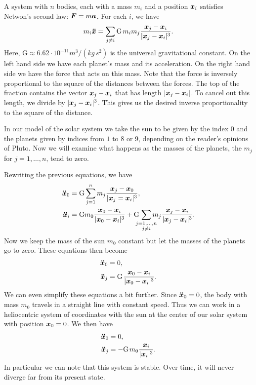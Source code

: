\documentclass[twoside,letterpaper,10pt]{article}
\numberwithin{equation}{section}
\begin{document}
A system with $n$ bodies, each with a mass $m_i$ and a position $\bm{x}_i$
satisfies Netwon's second law: $\bm{F} = m \bm{a}$.
For each $i$, we have
\begin{equation*}
  m_i \bdd{x} = \sum_{j \neq i} \mathrm{G} \nobreak\hspace{.125em plus
    .14286em} m_i m_j \frac{\bp{x}_j - \bp{x}_i}{|\bp{x}_j - \bp{x}_i|^3}.
\end{equation*}
Here, $\mathrm{G} \approx 6.62 \cdot 10^{-11} m^3 / (kg\, s^2)$ is the universal
gravitational constant.
On the left hand side we have each planet's mass and its acceleration.
On the right hand side we have the force that acts on this mass.
Note that the force is inversely proportional to the square of the distances
between the forces.
The top of the fraction contains the vector $\bm{x}_j - \bm{x}_i$ that has
length $|\bm{x}_j - \bm{x}_i|$.
To cancel out this length, we divide by $|\bm{x}_j - \bm{x}_i|^3$.
This gives us the desired inverse proportionality to the square of the distance.

In our model of the solar system we take the sun to be given by the index $0$
and the planets given by indices from $1$ to $8$ or $9$, depending on the
reader's opinions of Pluto.
Now we will examine what happens as the masses of the planets, the $m_j$ for $j
= 1, \ldots, n$, tend to zero.

Rewriting the previous equations, we have
\begin{align*}
  \bdd{x}_0 &= \mathrm{G} \sum_{j = 1}^n m_j \frac{\bp{x}_j -
              \bp{x}_0}{|\bp{x}_j = \bp{x}_i|^3},\\
  \bdd{x}_i &= \mathrm{G} m_0 \frac{\bp{x}_0 - \bp{x}_i}{|\bp{x}_0 -
              \bp{x}_i|^3} + \mathrm{G} \nobreak\hspace{.125em plus
              .14286em}
              \sum_{\mathclap{\substack{j=1,\ldots,n\\j\neq i}}}
              m_j \frac{\bp{x}_j - \bp{x}_i}{|\bp{x}_j - \bp{x}_i|^3}.
\end{align*}
Now we keep the mass of the sun $m_0$ constant but let the masses of the planets
go to zero.
These equations then become
\begin{align*}
  \bdd{x}_0 &= 0,\\
  \bdd{x}_j &= \mathrm{G} \nobreak\hspace{.125em plus .14286em} \frac{\bp{x}_0 -
              \bp{x}_i}{|\bp{x}_0 - \bp{x}_i|^3}.
\end{align*}
We can even simplify these equations a bit further.
Since $\bm{\ddot{x}}_0 = 0$, the body with mass $m_0$ travels in a straight line with
constant speed.
Thus we can work in a heliocentric system of coordinates with the sun at the
center of our solar system with position $\bm{x}_0 = 0$.
We then have
\begin{align*}
  \bdd{x}_0 &= 0,\\
  \bdd{x}_j &= - \mathrm{G} \nobreak\hspace{.125em plus .14286em}
              m_0 \frac{\bp{x}_i}{|\bp{x}_i|^3}.
\end{align*}
In particular we can note that this system is stable.
Over time, it will never diverge far from its present state.
\end{document}
